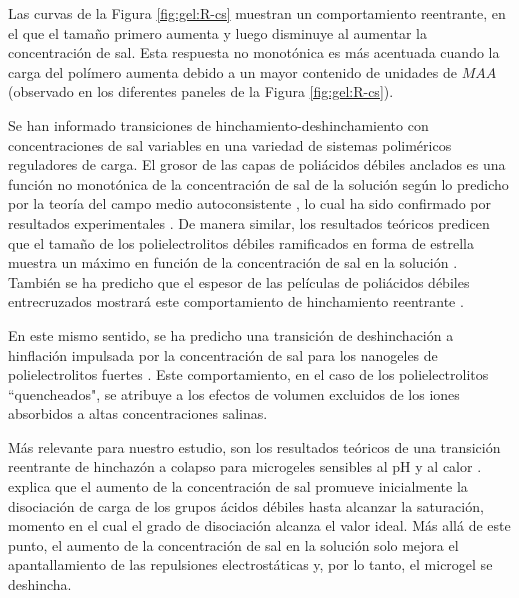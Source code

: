 Las curvas de la Figura \ref{fig:gel:R-cs} muestran un comportamiento reentrante, en el que el tama\~no primero aumenta y luego disminuye al aumentar la concentraci\'on de sal.
Esta respuesta no monot\'onica es m\'as acentuada cuando la carga del pol\'imero aumenta debido a un mayor contenido de unidades de $MAA$ (observado en los diferentes paneles de la Figura \ref{fig:gel:R-cs}).

Se han informado transiciones de hinchamiento-deshinchamiento con concentraciones de sal variables en una variedad de sistemas polim\'ericos reguladores de carga.
El grosor de las capas de poli\'acidos d\'ebiles anclados es una funci\'on no monot\'onica de la concentraci\'on de sal de la soluci\'on seg\'un lo predicho por la teor\'ia del campo medio autoconsistente \cite{Israels1994, Lyatskaya1995, Zhulina1995, Gong2007}, lo cual ha sido confirmado por resultados experimentales \cite{Wu2007}.
De manera similar, los resultados te\'oricos predicen que el tama\~no de los polielectrolitos d\'ebiles ramificados en forma de estrella muestra un m\'aximo en funci\'on de la concentraci\'on de sal en la soluci\'on \cite{Borisov1998, KleinWolterink2002}.
Tambi\'en se ha predicho que el espesor de las pel\'iculas de poli\'acidos d\'ebiles entrecruzados mostrar\'a este comportamiento de hinchamiento reentrante \cite{Longo2014JCP}.






En este mismo sentido, se ha predicho una transici\'on de deshinchaci\'on a hinflaci\'on impulsada por la concentraci\'on de sal para los nanogeles de polielectrolitos fuertes \cite{jha2012understanding}. Este comportamiento, en el caso de los polielectrolitos ``quencheados", se atribuye a los efectos de volumen excluidos de los iones absorbidos a altas concentraciones salinas.

M\'as relevante para nuestro estudio, son los resultados te\'oricos de una transici\'on reentrante de hinchaz\'on a colapso para microgeles sensibles al pH y al calor \cite{polotsky2013collapse}. \citet{polotsky2013collapse} explica que el aumento de la concentraci\'on de sal promueve inicialmente la disociaci\'on de carga de los grupos \'acidos d\'ebiles hasta alcanzar la saturaci\'on, momento en el cual el grado de disociaci\'on alcanza el valor ideal. M\'as all\'a de este punto, el aumento de la concentraci\'on de sal en la soluci\'on solo mejora el apantallamiento de las repulsiones electrost\'aticas y, por lo tanto, el microgel se deshincha.

